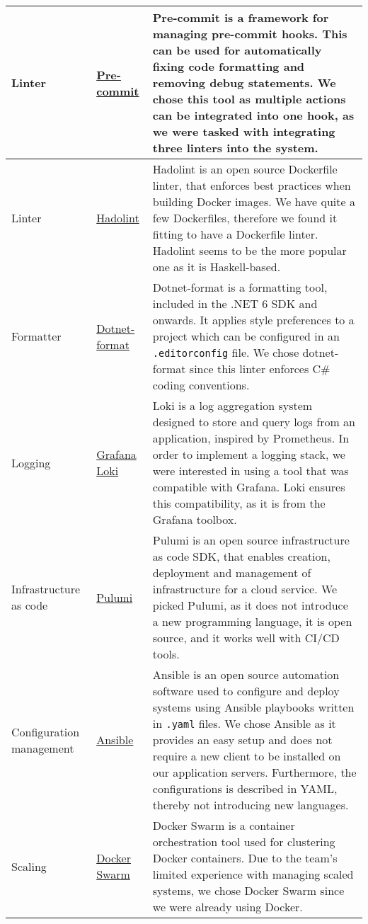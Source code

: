 \begin{longtable}{|p{}|p{} | p{}|}
    \hline
    Linter & \href{https://pre-commit.com/}{Pre-commit} & Pre-commit is a framework for managing pre-commit hooks. This can be used for automatically fixing code formatting and removing debug statements. We chose this tool as multiple actions can be integrated into one hook, as we were tasked with integrating three linters into the system.\\
    \hline
    Linter & \href{https://github.com/hadolint/hadolint}{Hadolint} & Hadolint is an open source Dockerfile linter, that enforces best practices when building Docker images. We have quite a few Dockerfiles, therefore we found it fitting to have a Dockerfile linter. Hadolint seems to be the more popular one as it is Haskell-based.\\
    \hline
    Formatter & \href{https://learn.microsoft.com/en-us/dotnet/core/tools/dotnet-format}{Dotnet-format} & Dotnet-format is a formatting tool, included in the .NET 6 SDK and onwards. It applies style preferences to a project which can be configured in an \texttt{.editorconfig} file. We chose dotnet-format since this linter enforces C\# coding conventions.\\
    \hline
    Logging & \href{https://grafana.com/docs/loki/latest/}{Grafana Loki} & Loki is a log aggregation system designed to store and query logs from an application, inspired by Prometheus. In order to implement a logging stack, we were interested in using a tool that was compatible with Grafana. Loki ensures this compatibility, as it is from the Grafana toolbox.\\
    \hline
    Infrastructure as code & \href{https://www.pulumi.com/docs/}{Pulumi} & Pulumi is an open source infrastructure as code SDK, that enables creation, deployment and management of infrastructure for a cloud service. We picked Pulumi, as it does not introduce a new programming language, it is open source, and it works well with CI/CD tools.\\
    \hline
    Configuration management & \href{https://docs.ansible.com/}{Ansible} & Ansible is an open source automation software used to configure and deploy systems using Ansible playbooks written in \texttt{.yaml} files. We chose Ansible as it provides an easy setup and does not require a new client to be installed on our application servers. Furthermore, the configurations is described in YAML, thereby not introducing new languages.\\
    \hline
    Scaling & \href{https://docs.docker.com/reference/cli/docker/swarm/}{Docker Swarm} & Docker Swarm is a container orchestration tool used for clustering Docker containers. Due to the team's limited experience with managing scaled systems, we chose Docker Swarm since we were already using Docker.\\

\end{longtable}
